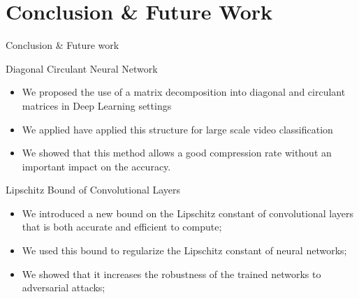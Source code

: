 \section{Conclusion \& Future Work}

\begin{frame}{Conclusion \& Future work}

 
  \begin{block}{Diagonal Circulant Neural Network}
  \begin{itemize}
    \item We proposed the use of a matrix decomposition into diagonal and circulant matrices in Deep Learning settings
    \item We applied have applied this structure for large scale video classification
    \item We showed that this method allows a good compression rate without an important impact on the accuracy. 
  \end{itemize}
  \end{block}

  \begin{block}{Lipschitz Bound of Convolutional Layers}
  \begin{itemize}
    \item We introduced a new bound on the Lipschitz constant of convolutional layers that is both accurate and efficient to compute;
    \item We used this bound to regularize the Lipschitz constant of neural networks;
    \item We showed that it increases the robustness of the trained networks to adversarial attacks;
  \end{itemize}
  \end{block}

\end{frame}


